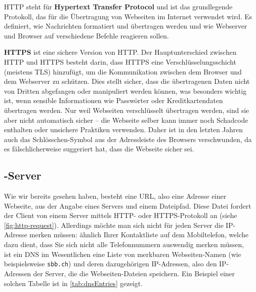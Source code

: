 \begin{myremark}
	\gls{HTTP} steht für \textbf{Hypertext Transfer Protocol} und ist das grundlegende Protokoll, das für die Übertragung von Webseiten im Internet verwendet wird. Es definiert, wie Nachrichten formatiert und übertragen werden und wie Webserver und Browser auf verschiedene Befehle reagieren sollen.

	\textbf{\gls{HTTPS}} ist eine sichere Version von \gls{HTTP}. Der Hauptunterschied zwischen \gls{HTTP} und \gls{HTTPS} besteht darin, dass \gls{HTTPS} eine Verschlüsselungsschicht (meistens \gls{TLS}) hinzufügt, um die Kommunikation zwischen dem Browser und dem Webserver zu schützen. Dies stellt sicher, dass die übertragenen Daten nicht von Dritten abgefangen oder manipuliert werden können, was besonders wichtig ist, wenn sensible Informationen wie Passwörter oder Kreditkartendaten übertragen werden. Nur weil Webseiten verschlüsselt übertragen werden, sind sie aber nicht automatisch sicher -- die Webseite selber kann immer noch Schadcode enthalten oder unsichere Praktiken verwenden. Daher ist in den letzten Jahren auch das Schlösschen-Symbol aus der Adressleiste des Browsers verschwunden, da es fälschlicherweise suggeriert hat, dass die Webseite sicher sei.
\end{myremark}

\subsection{\texorpdfstring{-Server}{DNS-Server}}
Wie wir bereits gesehen haben, besteht eine \gls{URL}, also eine Adresse einer Webseite, aus der Angabe eines Servers und einem Dateipfad. Diese Datei fordert der Client von einem Server mittels \gls{HTTP}- oder \gls{HTTPS}-Protokoll an (siehe \cref{fig:http-request}). Allerdings möchte man sich nicht für jeden Server die \gls{IP}-Adresse merken müssen: ähnlich Ihrer Kontaktliste auf dem Mobiltelefon, welche dazu dient, dass Sie sich nicht alle Telefonnummern auswendig merken müssen, ist ein \gls{DNS} im Wesentlichen eine Liste von merkbaren Webseiten-Namen (wie beispielsweise \texttt{sbb.ch}) und deren dazugehörigen \gls{IP}-Adressen, also den \gls{IP}-Adressen der Server, die die Webseiten-Dateien speichern. Ein Beispiel einer solchen Tabelle ist in \cref{tab:dnsEntries} gezeigt.

